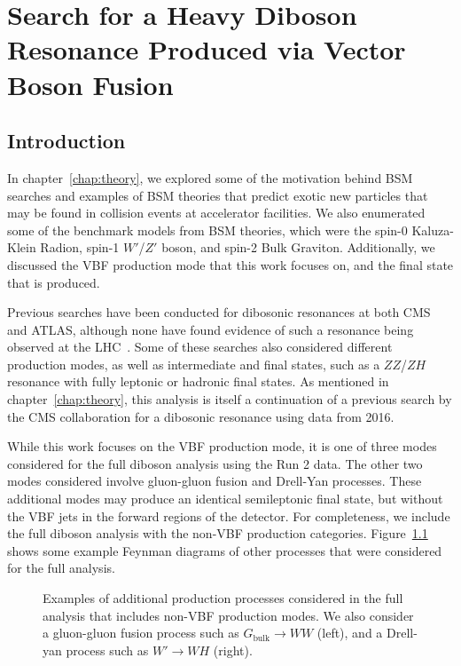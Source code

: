 
\chapter{Search for a Heavy Diboson Resonance Produced via Vector Boson Fusion}
\label{chap:analysis}

\section{Introduction}

In chapter~\ref{chap:theory}, we explored some of the motivation behind BSM searches and examples of BSM theories that predict exotic new particles that may be found in collision events at accelerator facilities.
We also enumerated some of the benchmark models from BSM theories, which were the spin-0 Kaluza-Klein Radion, spin-1 $W'$/$Z'$ boson, and spin-2 Bulk Graviton.
Additionally, we discussed the VBF production mode that this work focuses on, and the final state that is produced.

Previous searches have been conducted for dibosonic resonances at both CMS and ATLAS, although none have found evidence of such a resonance being observed at the LHC~\cite{Aaboud_2018,Aaboud_2018_2,Aad_2015,Khachatryan_2014,Sirunyan_2017,Sirunyan_2017_2,atlas2020}.
Some of these searches also considered different production modes, as well as intermediate and final states, such as a $ZZ$/$ZH$ resonance with fully leptonic or hadronic final states.
As mentioned in chapter~\ref{chap:theory}, this analysis is itself a continuation of a previous search by the CMS collaboration for a dibosonic resonance using data from 2016.

While this work focuses on the VBF production mode, it is one of three modes considered for the full diboson analysis using the Run 2 data.
The other two modes considered involve gluon-gluon fusion and Drell-Yan processes.
These additional modes may produce an identical semileptonic final state, but without the VBF jets in the forward regions of the detector.
For completeness, we include the full diboson analysis with the non-VBF production categories.
Figure~\ref{fig:nonVbf} shows some example Feynman diagrams of other processes that were considered for the full analysis.

\begin{figure}[htbp]
  \centering
  
  \caption{
    Examples of additional production processes considered in the full analysis that includes non-VBF production modes.
    We also consider a gluon-gluon fusion process such as $G_\mathrm{bulk}\to WW$ (left), and a Drell-yan process such as $W'\to WH$ (right).
  }
  \label{fig:nonVbf}
\end{figure}

